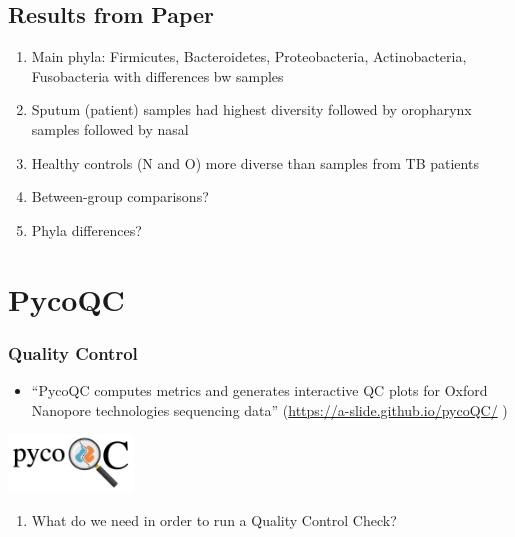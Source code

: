 \documentclass[
]{book}
\providecommand{\tightlist}{%
  \setlength{\itemsep}{0pt}\setlength{\parskip}{0pt}}
\begin{document}
\hypertarget{results-from-paper}{%
\section{Results from Paper}\label{results-from-paper}}

\begin{enumerate}
\def\labelenumi{\arabic{enumi}.}
\tightlist
\item
  Main phyla: Firmicutes, Bacteroidetes, Proteobacteria, Actinobacteria, Fusobacteria with differences bw samples
\item
  Sputum (patient) samples had highest diversity followed by oropharynx samples followed by nasal
\item
  Healthy controls (N and O) more diverse than samples from TB patients
\item
  Between-group comparisons?
\item
  Phyla differences?
\end{enumerate}

\hypertarget{pycoqc}{%
\chapter{PycoQC}\label{pycoqc}}

\hypertarget{quality-control}{%
\subsection*{Quality Control}\label{quality-control}}

\begin{itemize}
\tightlist
\item
  ``PycoQC computes metrics and generates interactive QC plots for Oxford Nanopore technologies sequencing data'' (\url{https://a-slide.github.io/pycoQC/} )
\end{itemize}

\includegraphics[width=0.25\textwidth,height=\textheight]{Figures/Pyco2.png}

\begin{enumerate}
\def\labelenumi{\arabic{enumi}.}
\tightlist
\item
  What do we need in order to run a Quality Control Check?
\end{enumerate}
\end{document}
